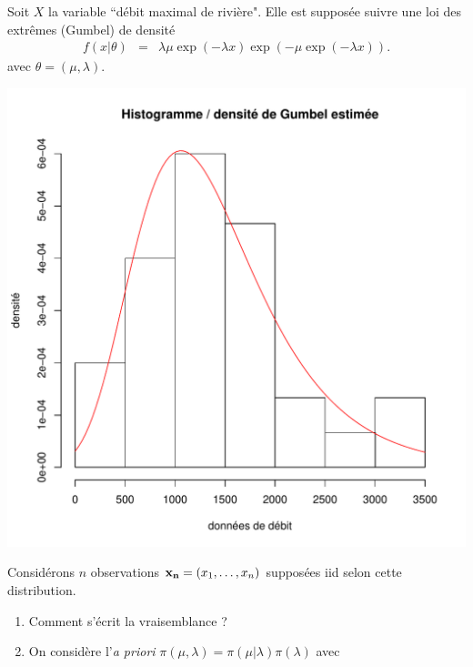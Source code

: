 \documentclass[10pt]{article}
\begin{document}

\fi

\if{} \vspace{1cm}
\begin{exec}\label{debit.extreme}
Soit $X$ la variable ``débit maximal de rivière". Elle est supposée suivre une loi des extrêmes (Gumbel) de densité
\begin{eqnarray*}
f(x|\theta) & = &  \lambda\mu\exp(-\lambda x)
\exp(-\mu\exp(-\lambda x)).
\end{eqnarray*}
avec $\theta=(\mu,\lambda)$. %
\begin{center}
\includegraphics[scale=0.4]{figures/calcul/hist-gumbel.pdf}
\end{center}
Considérons $n$ observations ${\bf x_n}=(x_1,\ldots,x_n)$ supposées iid  selon cette distribution. 
\begin{enumerate}
    \item Comment s'écrit la vraisemblance ?
    \item On considère l'{\it a priori} $\pi(\mu,\lambda) = \pi(\mu|\lambda)\pi(\lambda)$ avec
\begin{eqnarray*}

\end{eqnarray*}
\end{enumerate}
\end{exec}
\end{document}
